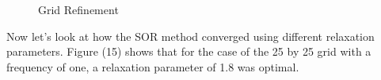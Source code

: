 \documentclass{article}
\begin{document}
\begin{figure}[H]
\centering
{}
\caption{Grid Refinement}
\end{figure}

\vspace{1em}

\noindent Now let's look at how the SOR method converged using different relaxation parameters. Figure (15) shows that for the case of the 25 by 25 grid with a frequency of one, a relaxation parameter of 1.8 was optimal.
\end{document}
